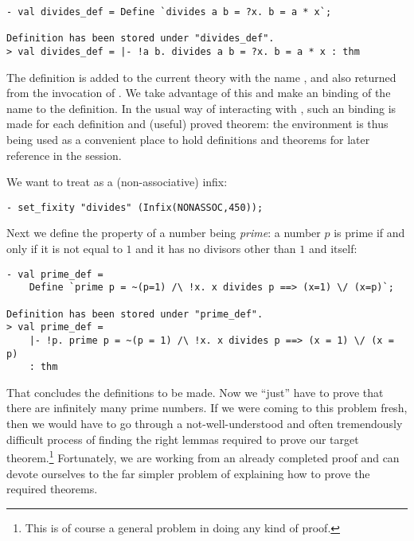 \begin{session}
\begin{verbatim}
- val divides_def = Define `divides a b = ?x. b = a * x`;

Definition has been stored under "divides_def".
> val divides_def = |- !a b. divides a b = ?x. b = a * x : thm
\end{verbatim}
\end{session}

The definition is added to the current theory with the name
, and also returned from the invocation of
. We take advantage of this and make an \ML{} binding of
the name  to the definition. In the usual way of
interacting with \HOL, such an \ML{} binding is made for each
definition and (useful) proved theorem: the \ML{} environment is thus
being used as a convenient place to hold definitions and theorems for
later reference in the session.

We want to treat  as a (non-associative) infix:
\begin{session}
\begin{verbatim}
- set_fixity "divides" (Infix(NONASSOC,450));
\end{verbatim}
\end{session}
Next we define the property of a number being \emph{prime}: a number $p$ is
prime if and only if it is not equal to $1$ and it has no divisors other
than $1$ and itself:

\begin{session}
\begin{verbatim}
- val prime_def =
    Define `prime p = ~(p=1) /\ !x. x divides p ==> (x=1) \/ (x=p)`;

Definition has been stored under "prime_def".
> val prime_def =
    |- !p. prime p = ~(p = 1) /\ !x. x divides p ==> (x = 1) \/ (x = p)
    : thm
\end{verbatim}
\end{session}

That concludes the definitions to be made. Now we ``just'' have to prove
that there are infinitely many prime numbers. If we were coming to this
problem fresh, then we would have to go through a not-well-understood
and often tremendously difficult process of finding the right lemmas
required to prove our target theorem.\footnote{This is of course a
general problem in doing any kind of proof.} Fortunately, we are working
from an already completed proof and can devote ourselves to the far
simpler problem of explaining how to prove the required theorems.

